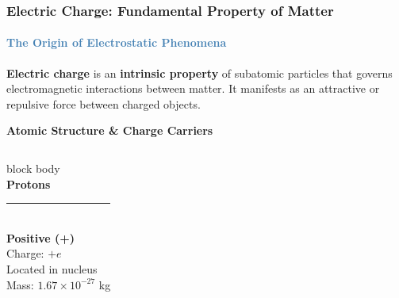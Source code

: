 \begin{frame}
\frametitle{\textsf{\textbf{Electric Charge:} Fundamental Property of Matter}}
\framesubtitle{\textcolor{steelblue}{The Origin of Electrostatic Phenomena}}

\vspace{-0.1cm}

\begin{keybox}
\vspace{0.1cm}
\textbf{Electric charge} is an \textbf{\textcolor{importantRed}{intrinsic property}} of subatomic particles that governs electromagnetic interactions between matter. It manifests as an attractive or repulsive force between charged objects.
\vspace{0.1cm}
\end{keybox}

\vspace{0.4cm}

\begin{center}
\textsf{\Large\textbf{\textcolor{deepnavy}{Atomic Structure \& Charge Carriers}}}
\end{center}

\vspace{0.2cm}

\begin{columns}[T]
    \begin{beamercolorbox}[wd=\textwidth,rounded=true,shadow=true,center]{block body}
    \vspace{0.15cm}
    \centering
    {\Large\textcolor{importantRed}{}}\\
    \vspace{0.1cm}
    \textbf{\Large\textsf{Protons}}\\
    \vspace{0.05cm}
    {\color{accentorange}\rule{0.6\textwidth}{1.5pt}}\\
    \vspace{0.1cm}
    \textcolor{importantRed}{\textbf{Positive (+)}}\\
    {\small Charge: $+e$}\\
    {\scriptsize Located in nucleus}\\
    {\scriptsize Mass: $1.67 \times 10^{-27}$ kg}
    \vspace{0.15cm}
    \end{beamercolorbox}
    

\end{columns}
\end{frame}
